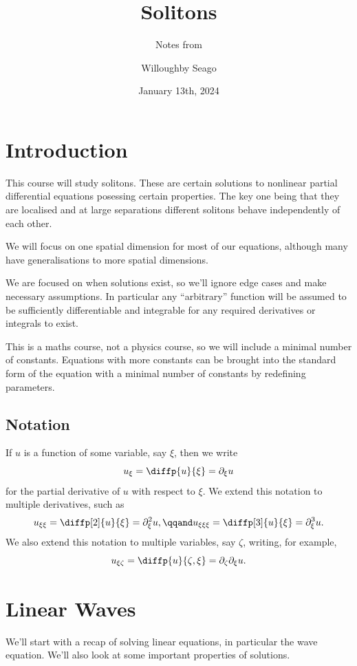 \documentclass[fleqn]{NotesClass}
\title{Solitons}
\author{Willoughby Seago}
\date{January 13th, 2024}
\subtitle{Notes from}
\begin{document}
    \frontmatter
    \titlepage
    \tableofcontents
    \mainmatter
    \chapter{Introduction}
    This course will study solitons.
    These are certain solutions to nonlinear partial differential equations posessing certain properties.
    The key one being that they are localised and at large separations different solitons behave independently of each other.
    
    We will focus on one spatial dimension for most of our equations, although many have generalisations to more spatial dimensions.
    
    We are focused on when solutions exist, so we'll ignore edge cases and make necessary assumptions.
    In particular any \enquote{arbitrary} function will be assumed to be sufficiently differentiable and integrable for any required derivatives or integrals to exist.
    
    This is a maths course, not a physics course, so we will include a minimal number of constants.
    Equations with more constants can be brought into the standard form of the equation with a minimal number of constants by redefining parameters.
    
    \section{Notation}
    If \(u\) is a function of some variable, say \(\xi\), then we write
    \begin{equation}
        u_\xi = \diffp{u}{\xi} = \partial_\xi u
    \end{equation}
    for the partial derivative of \(u\) with respect to \(\xi\).
    We extend this notation to multiple derivatives, such as
    \begin{equation}
        u_{\xi\xi} = \diffp[2]{u}{\xi} = \partial_\xi^2 u, \qqand u_{\xi\xi\xi} = \diffp[3]{u}{\xi} = \partial_\xi^3 u.
    \end{equation}
    We also extend this notation to multiple variables, say \(\zeta\), writing, for example,
    \begin{equation}
        u_{\xi\zeta} = \diffp{u}{\zeta,\xi} = \partial_\zeta \partial_\xi u.
    \end{equation}
    
    \chapter{Linear Waves}
    We'll start with a recap of solving linear equations, in particular the wave equation.
    We'll also look at some important properties of solutions.
    
\end{document}
